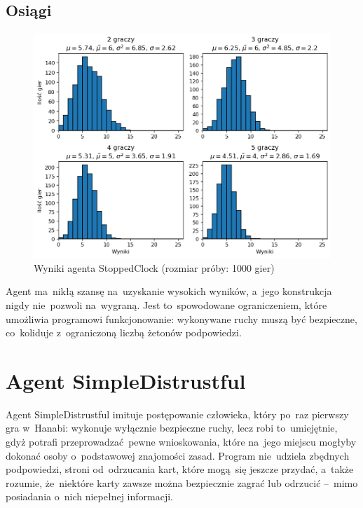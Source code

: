 \documentclass[declaration,shortabstract,inz]{iithesis}
\begin{document}
\subsection*{Osiągi}

\begin{figure}[H]
	\centering
	\captionsetup{format=hang}
	\includegraphics[width=\textwidth,height=\textheight,keepaspectratio]{StoppedClock.png}
	\caption[Caption]{Wyniki agenta StoppedClock (rozmiar próby: 1000 gier)}
	\label{fig:StoppedClock}
\end{figure}

Agent ma~nikłą szansę na~uzyskanie wysokich wyników, a~jego konstrukcja nigdy nie~pozwoli na~wygraną. Jest to~spowodowane ograniczeniem, które umożliwia programowi funkcjonowanie: wykonywane ruchy muszą być bezpieczne, co~koliduje z~ograniczoną liczbą żetonów podpowiedzi.

\section{Agent SimpleDistrustful}

Agent SimpleDistrustful imituje postępowanie człowieka, który po~raz pierwszy gra w~Hanabi: wykonuje wyłącznie bezpieczne ruchy, lecz robi to~umiejętnie, gdyż potrafi przeprowadzać pewne wnioskowania, które na~jego miejscu mogłyby dokonać osoby o~podstawowej znajomości zasad. Program nie~udziela zbędnych podpowiedzi, stroni od~odrzucania kart, które mogą~się jeszcze przydać, a~także rozumie, że~niektóre karty zawsze można bezpiecznie zagrać lub odrzucić --~mimo posiadania o~nich niepełnej informacji.
\end{document}
